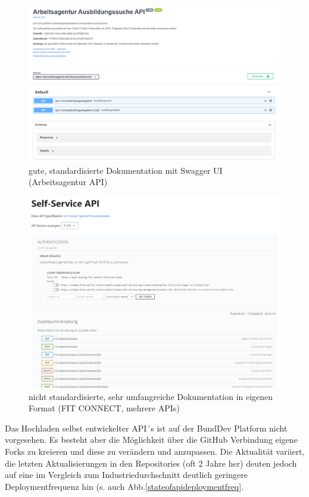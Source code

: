 \documentclass[notitlepage, hidelinks]{article}
\begin{document}
\begin{figure}[H]
\centering
  \includegraphics[width=\textwidth]{images/bundwebsite3.png}
  \caption{gute, standardisierte Dokumentation mit Swagger UI (Arbeitsagentur API)}
  \label{bundwebsite3}
\end{figure}

\begin{figure}[H]
\centering
  \includegraphics[width=\textwidth]{images/bundwebsite5.png}
  \caption{nicht standardisierte, sehr umfangreiche Dokumentation in eigenen Format (FIT CONNECT, mehrere APIs)}
  \label{bundwebsite5}
\end{figure}


Das Hochladen selbst entwickelter API´s ist auf der BundDev Platform nicht vorgesehen. Es besteht aber die Möglichkeit über die GitHub Verbindung eigene Forks zu kreieren und diese zu verändern und anzupassen. Die Aktualität variiert, die letzten Aktualisierungen in den Repositories (oft 2 Jahre her) deuten jedoch auf eine im Vergleich zum Industriedurchschnitt deutlich geringere Deploymentfrequenz hin (s. auch Abb.\ref{stateofapideploymentfreq}.
\end{document}

